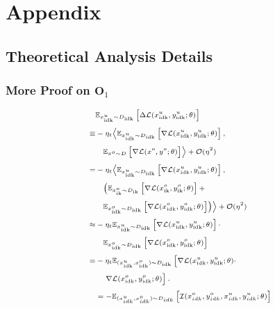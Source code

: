 \section{Appendix}
\label{sec:appendix}

\subsection{Theoretical Analysis Details}
\subsubsection{More Proof on $\mathbf{O}_1$}
\label{app:More Proof on O1}

\begin{equation}
\scriptsize
\setlength{\jot}{5pt} %
\label{eq:loss_decomposition}
\begin{aligned}
&\mathbb{E}_{x^{u}_{\text{idk}} \sim D_{\text{idk}}} \left[ \Delta \mathcal{L}(x^{u}_{\text{idk}}, y^{u}_{\text{idk}}; \theta) \right] \\
\equiv & -\eta_t \Bigl \langle  
\mathbb{E}_{x^{u}_{\text{idk}} \sim D_{\text{idk}}} \left[ \nabla \mathcal{L}(x^{u}_{\text{idk}}, y^{u}_{\text{idk}}; \theta) \right], \\
&\quad \mathbb{E}_{x^{o} \sim D} \left[ \nabla \mathcal{L}(x^{o}, y^{o}; \theta) \right] \Bigr \rangle + \mathcal{O}(\eta^2) \\ 
= & -\eta_t \Bigl \langle  
\mathbb{E}_{x^{u}_{\text{idk}} \sim D_{\text{idk}}} \left[ \nabla \mathcal{L}(x^{u}_{\text{idk}}, y^{u}_{\text{idk}}; \theta) \right], \\
&\quad \Bigl( \mathbb{E}_{x^{o}_{\text{ik}} \sim D_{\text{ik}}} \left[ \nabla \mathcal{L}(x^{o}_{\text{ik}}, y^{o}_{\text{ik}}; \theta) \right] + \\
&\quad \mathbb{E}_{x^{o}_{\text{idk}} \sim D_{\text{idk}}} \left[ \nabla \mathcal{L}(x^{o}_{\text{idk}}, y^{o}_{\text{idk}}; \theta) \right] 
\Bigr) \Bigr \rangle + \mathcal{O}(\eta^2) \\
\approx & -\eta_t \mathbb{E}_{x^{u}_{\text{idk}} \sim D_{\text{idk}}} \left[ \nabla \mathcal{L}(x^{u}_{\text{idk}}, y^{u}_{\text{idk}}; \theta) \right] \cdot \\
&\quad \mathbb{E}_{x^{o}_{\text{idk}} \sim D_{\text{idk}}} \left[ \nabla \mathcal{L}(x^{o}_{\text{idk}}, y^{o}_{\text{idk}}; \theta) \right] \\
= & -\eta_t 
\mathbb{E}_{(x^{u}_{\text{idk}},x^o_{\text{idk}}) \sim D_{\text{idk}}} \left[ \nabla \mathcal{L}(x^{u}_{\text{idk}}, y^{u}_{\text{idk}}; \theta) \cdot \right. \\
&\quad \left. \nabla \mathcal{L} (x^{o}_{\text{idk}},y^{o}_{\text{idk}}; \theta) \right]. \\
& = - \mathbb{E}_{(x^{u}_{idk}, x^o_{idk}) \sim D_{idk}} \left[ \mathcal{I}(x^{o}_{idk}, y^{o}_{idk}, x^{u}_{idk}, y^{u}_{idk}; \theta) \right]
\end{aligned}
\end{equation}


